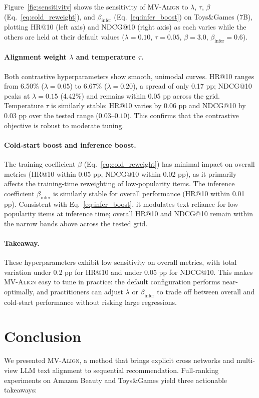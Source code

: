 \documentclass[sigconf,natbib=true,anonymous]{acmart}
\newcommand{\model}{\textsc{MV-Align}\xspace}
\newcommand{\llm}{\textsc{LLM}\xspace}
\begin{document}
Figure~\ref{fig:sensitivity} shows the sensitivity of \model to
$\lambda$, $\tau$, $\beta$ (Eq.~\eqref{eq:cold_reweight}), and
$\beta_{\text{infer}}$ (Eq.~\eqref{eq:infer_boost}) on Toys\&Games (7B),
plotting HR@10 (left axis) and NDCG@10 (right axis) as each varies
while the others are held at their default values ($\lambda{=}0.10$,
$\tau{=}0.05$, $\beta{=}3.0$, $\beta_{\text{infer}}{=}0.6$).

\paragraph{Alignment weight $\lambda$ and temperature $\tau$.}
Both contrastive hyperparameters show smooth, unimodal curves.
HR@10 ranges from 6.50\% ($\lambda{=}0.05$) to 6.67\%
($\lambda{=}0.20$), a spread of only 0.17 pp; NDCG@10 peaks at
$\lambda{=}0.15$ (4.42\%) and remains within 0.05 pp across the
grid. Temperature $\tau$ is similarly stable: HR@10 varies by
0.06 pp and NDCG@10 by 0.03 pp over the tested range
($0.03$--$0.10$). This confirms that the contrastive objective is
robust to moderate tuning.

\paragraph{Cold-start boost and inference boost.}
The training coefficient $\beta$ (Eq.~\eqref{eq:cold_reweight}) has minimal impact on overall
metrics (HR@10 within 0.05 pp, NDCG@10 within 0.02 pp), as it
primarily affects the training-time reweighting of low-popularity
items. The inference coefficient $\beta_{\text{infer}}$ is similarly stable for overall
performance (HR@10 within 0.01 pp). Consistent with
Eq.~\eqref{eq:infer_boost}, it modulates text reliance for
low-popularity items at inference time; overall HR@10 and
NDCG@10 remain within the narrow bands above across the tested grid.

\paragraph{Takeaway.}
These hyperparameters exhibit low sensitivity on overall metrics,
with total variation under 0.2 pp for HR@10 and under 0.05 pp for
NDCG@10. This makes \model easy to tune in practice: the default
configuration performs near-optimally, and practitioners can adjust
$\lambda$ or $\beta_{\text{infer}}$ to trade off between overall and
cold-start performance without risking large regressions.

\section{Conclusion}
We presented \model, a method that brings explicit cross networks and
multi-view \llm text alignment to sequential recommendation.
Full-ranking experiments on Amazon Beauty and Toys\&Games yield three
actionable takeaways:
\end{document}
